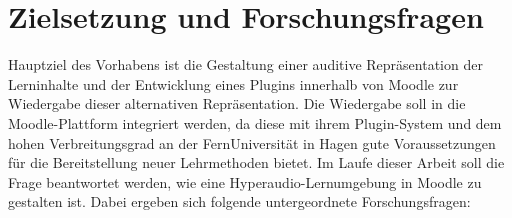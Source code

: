 %
%
%


\section{Zielsetzung und Forschungsfragen}
\label{sec:zielsetzung}
Hauptziel des Vorhabens ist die Gestaltung einer auditive Repräsentation der Lerninhalte und der Entwicklung eines Plugins innerhalb von Moodle zur Wiedergabe dieser alternativen Repräsentation. Die Wiedergabe soll in die Moodle-Plattform integriert werden, da diese mit ihrem Plugin-System und dem hohen Verbreitungsgrad an der FernUniversität in Hagen gute Voraussetzungen für die Bereitstellung neuer Lehrmethoden bietet.
Im Laufe dieser Arbeit soll die Frage beantwortet werden, wie eine Hyperaudio-Lernumgebung in Moodle zu gestalten ist. Dabei ergeben sich folgende untergeordnete Forschungsfragen:

